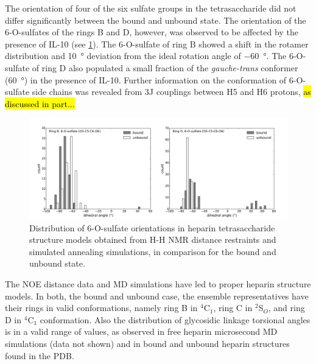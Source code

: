 The orientation of four of the six sulfate groups in the tetrasaccharide did not
differ significantly between the bound and unbound state. The orientation of the
6-O-sulfates of the rings B and D, however, was observed to be affected by the
presence of IL-10 (see \cref{fig:nmr:hp_sulfate_orientations}). The 6-O-sulfate
of ring B showed a shift in the rotamer distribution and \SI{10}{\degree}
deviation from the ideal rotation angle of \SI{-60}{\degree}. The 6-O-sulfate of
ring D also populated a small fraction of the \textit{gauche-trans} conformer
(\SI{60}{\degree}) in the presence of IL-10. Further information on the
conformation of 6-O-sulfate side chains was revealed from 3J couplings between
H5 and H6 protons, \hl{as discussed in part...}

\begin{figure}
\centering
\includegraphics[width=\textwidth]{gfx/nmr/SI_figure_6O_sulfate_dihedrals_B_D_01.png}
\caption[]{
Distribution of 6-O-sulfate orientations in heparin tetrasaccharide structure
models obtained from H-H NMR distance restraints and simulated annealing
simulations, in comparison for the bound and unbound state.
}
\label{fig:nmr:hp_sulfate_orientations}
\end{figure}

The NOE distance data and MD simulations have led to proper heparin structure
models. In both, the bound and unbound case, the ensemble representatives have
their rings in valid conformations, namely ring B in ${}^4$C${}_1$, ring C in
${}^2$S${}_O$, and ring D in ${}^4$C${}_1$ conformation. Also the distribution
of glycosidic linkage torsional angles is in a valid range of values, as
observed in free heparin microsecond MD simulations (data not shown) and in
bound and unbound heparin structures found in the PDB.

